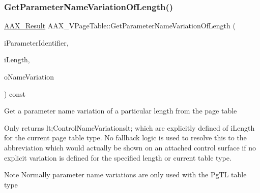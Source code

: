 \mbox{\label{a01929_a4b921a55a35d0a642dbcd4402544f0ee}} 
\subsubsection{\texorpdfstring{GetParameterNameVariationOfLength()}{GetParameterNameVariationOfLength()}}
{\footnotesize\ttfamily \mbox{\hyperlink{a00392_a4d8f69a697df7f70c3a8e9b8ee130d2f}{A\+A\+X\+\_\+\+Result}} A\+A\+X\+\_\+\+V\+Page\+Table\+::\+Get\+Parameter\+Name\+Variation\+Of\+Length (\begin{DoxyParamCaption}\item[{\mbox{\hyperlink{a00392_ab4e01b971dac1b25632fd9f710dd8f77}{A\+A\+X\+\_\+\+C\+Page\+Table\+Param\+ID}}}]{i\+Parameter\+Identifier,  }\item[{int32\+\_\+t}]{i\+Length,  }\item[{\mbox{\hyperlink{a01873}{A\+A\+X\+\_\+\+I\+String}} \&}]{o\+Name\+Variation }\end{DoxyParamCaption}) const\hspace{0.3cm}{\ttfamily [virtual]}}





Get a parameter name variation of a particular length from the page table

Only returns {\ttfamily lt;Control\+Name\+Variationslt;} which are explicitly defined of {\ttfamily i\+Length} for the current page table type. No fallback logic is used to resolve this to the abbreviation which would actually be shown on an attached control surface if no explicit variation is defined for the specified length or current table type.

\begin{DoxyNote}{Note}
Normally parameter name variations are only used with the {\ttfamily \textquotesingle{}Pg\+TL\textquotesingle{}} table type
\end{DoxyNote}

